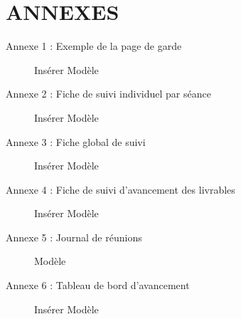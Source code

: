 \section{ANNEXES}
\begin{description}
\item[Annexe 1 : Exemple de la page de garde]
    {Insérer Modèle}
\item[Annexe 2 : Fiche de suivi individuel par séance]
    Insérer Modèle
\item[Annexe 3 : Fiche global de suivi]
    Insérer Modèle
\item[Annexe 4 : Fiche de suivi d'avancement des livrables]
    Insérer Modèle
\item[Annexe 5 : Journal de réunions]
    Modèle
\item[Annexe 6 : Tableau de bord d'avancement]
    Insérer Modèle
\end{description}
